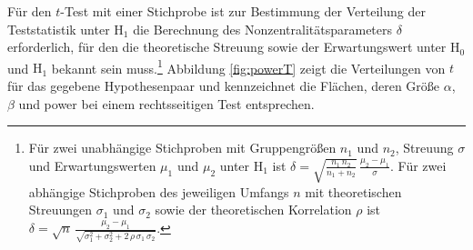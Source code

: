 Für den $t$-Test mit einer Stichprobe ist zur Bestimmung der Verteilung der Teststatistik unter $\text{H}_{1}$ die Berechnung des Nonzentralitätsparameters $\delta$ erforderlich, für den die theoretische Streuung sowie der Erwartungswert unter $\text{H}_{0}$ und $\text{H}_{1}$ bekannt sein muss.\footnote{Für zwei unabhängige Stichproben mit Gruppengrößen $n_{1}$ und $n_{2}$, Streuung $\sigma$ und Erwartungswerten $\mu_{1}$ und $\mu_{2}$ unter $\text{H}_{1}$ ist $\delta = \sqrt{\frac{n_{1} \, n_{2}}{n_{1}+n_{2}}} \, \frac{\mu_{2}-\mu_{1}}{\sigma}$. Für zwei abhängige Stichproben des jeweiligen Umfangs $n$ mit theoretischen Streuungen $\sigma_{1}$ und $\sigma_{2}$ sowie der theoretischen Korrelation $\rho$ ist $\delta = \sqrt{n} \, \frac{\mu_{2}-\mu_{1}}{\sqrt{\sigma_{1}^{2} + \sigma_{2}^{2} + 2 \, \rho \, \sigma_{1} \, \sigma_{2}}}$.} Abbildung \ref{fig:powerT} zeigt die Verteilungen von $t$ für das gegebene Hypothesenpaar und kennzeichnet die Flächen, deren Größe $\alpha$, $\beta$ und power bei einem rechtsseitigen Test entsprechen.
